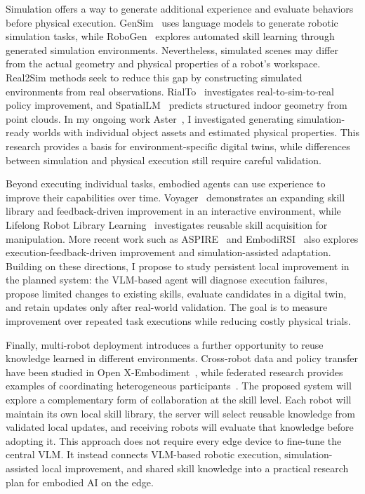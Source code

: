 \documentclass[11pt]{article}
\begin{document}
Simulation offers a way to generate additional experience and evaluate behaviors before physical execution. GenSim~\cite{wang2024gensim} uses language models to generate robotic simulation tasks, while RoboGen~\cite{wang2024robogen} explores automated skill learning through generated simulation environments. Nevertheless, simulated scenes may differ from the actual geometry and physical properties of a robot's workspace. Real2Sim methods seek to reduce this gap by constructing simulated environments from real observations. RialTo~\cite{torne2024rialto} investigates real-to-sim-to-real policy improvement, and SpatialLM~\cite{mao2025spatiallm} predicts structured indoor geometry from point clouds. In my ongoing work Aster~\cite{aster2026}, I investigated generating simulation-ready worlds with individual object assets and estimated physical properties. This research provides a basis for environment-specific digital twins, while differences between simulation and physical execution still require careful validation.

Beyond executing individual tasks, embodied agents can use experience to improve their capabilities over time. Voyager~\cite{wang2024voyager} demonstrates an expanding skill library and feedback-driven improvement in an interactive environment, while Lifelong Robot Library Learning~\cite{tziafas2024lrll} investigates reusable skill acquisition for manipulation. More recent work such as ASPIRE~\cite{lu2026aspire} and EmbodiRSI~\cite{lang2026embodirsi} also explores execution-feedback-driven improvement and simulation-assisted adaptation. Building on these directions, I propose to study persistent local improvement in the planned system: the VLM-based agent will diagnose execution failures, propose limited changes to existing skills, evaluate candidates in a digital twin, and retain updates only after real-world validation. The goal is to measure improvement over repeated task executions while reducing costly physical trials.

Finally, multi-robot deployment introduces a further opportunity to reuse knowledge learned in different environments. Cross-robot data and policy transfer have been studied in Open X-Embodiment~\cite{openx2024}, while federated research provides examples of coordinating heterogeneous participants~\cite{flora2024,fedmoa2026}. The proposed system will explore a complementary form of collaboration at the skill level. Each robot will maintain its own local skill library, the server will select reusable knowledge from validated local updates, and receiving robots will evaluate that knowledge before adopting it. This approach does not require every edge device to fine-tune the central VLM. It instead connects VLM-based robotic execution, simulation-assisted local improvement, and shared skill knowledge into a practical research plan for embodied AI on the edge.
\end{document}
